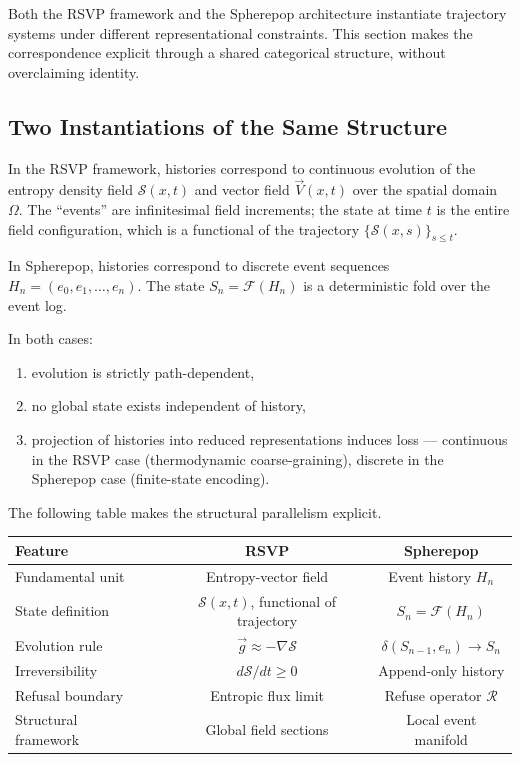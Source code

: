 \documentclass[12pt, twoside]{article}
\theoremstyle{plain}
\theoremstyle{definition}
\theoremstyle{remark}
\begin{document}
Both the RSVP framework and the Spherepop architecture
instantiate trajectory systems under different representational
constraints.
This section makes the correspondence explicit through a shared
categorical structure, without overclaiming identity.

\subsection{Two Instantiations of the Same Structure}

In the RSVP framework, histories correspond to continuous evolution
of the entropy density field $\mathcal{S}(x,t)$ and vector field
$\vec{V}(x,t)$ over the spatial domain $\Omega$.
The ``events'' are infinitesimal field increments;
the state at time $t$ is the entire field configuration,
which is a functional of the trajectory
$\{\mathcal{S}(x,s)\}_{s \leq t}$.

In Spherepop, histories correspond to discrete event sequences
$H_n = (e_0, e_1, \dots, e_n)$.
The state $S_n = \mathcal{F}(H_n)$ is a deterministic fold
over the event log.

In both cases:
\begin{enumerate}
  \item evolution is strictly path-dependent,
  \item no global state exists independent of history,
  \item projection of histories into reduced representations
    induces loss — continuous in the RSVP case
    (thermodynamic coarse-graining),
    discrete in the Spherepop case (finite-state encoding).
\end{enumerate}

The following table makes the structural parallelism explicit.

\begin{center}
\begin{tabular}{lccc}
\toprule
\textbf{Feature} & & \textbf{RSVP} & \textbf{Spherepop} \\
\midrule
Fundamental unit      && Entropy-vector field & Event history $H_n$ \\
State definition      && $\mathcal{S}(x,t)$, functional of trajectory & $S_n = \mathcal{F}(H_n)$ \\
Evolution rule        && $\vec{g} \approx -\nabla \mathcal{S}$ & $\delta(S_{n-1}, e_n) \to S_n$ \\
Irreversibility       && $d\mathcal{S}/dt \geq 0$ & Append-only history \\
Refusal boundary      && Entropic flux limit & Refuse operator $\mathcal{R}$ \\
Structural framework  && Global field sections & Local event manifold \\
\bottomrule
\end{tabular}
\end{center}
\end{document}
